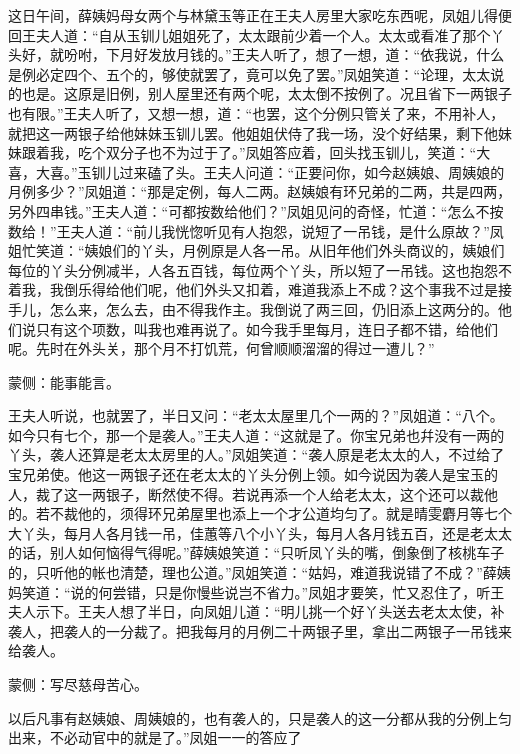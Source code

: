 \begin{parag}
    这日午间，薛姨妈母女两个与林黛玉等正在王夫人房里大家吃东西呢，凤姐儿得便回王夫人道：“自从玉钏儿姐姐死了，太太跟前少着一个人。太太或看准了那个丫头好，就吩咐，下月好发放月钱的。”王夫人听了，想了一想，道：“依我说，什么是例必定四个、五个的，够使就罢了，竟可以免了罢。”凤姐笑道：“论理，太太说的也是。这原是旧例，别人屋里还有两个呢，太太倒不按例了。况且省下一两银子也有限。”王夫人听了，又想一想，道：“也罢，这个分例只管关了来，不用补人，就把这一两银子给他妹妹玉钏儿罢。他姐姐伏侍了我一场，没个好结果，剩下他妹妹跟着我，吃个双分子也不为过于了。”凤姐答应着，回头找玉钏儿，笑道：“大喜，大喜。”玉钏儿过来磕了头。王夫人问道：“正要问你，如今赵姨娘、周姨娘的月例多少？”凤姐道：“那是定例，每人二两。赵姨娘有环兄弟的二两，共是四两，另外四串钱。”王夫人道：“可都按数给他们？”凤姐见问的奇怪，忙道：“怎么不按数给！”王夫人道：“前儿我恍惚听见有人抱怨，说短了一吊钱，是什么原故？”凤姐忙笑道：“姨娘们的丫头，月例原是人各一吊。从旧年他们外头商议的，姨娘们每位的丫头分例减半，人各五百钱，每位两个丫头，所以短了一吊钱。这也抱怨不着我，我倒乐得给他们呢，他们外头又扣着，难道我添上不成？这个事我不过是接手儿，怎么来，怎么去，由不得我作主。我倒说了两三回，仍旧添上这两分的。他们说只有这个项数，叫我也难再说了。如今我手里每月，连日子都不错，给他们呢。先时在外头关，那个月不打饥荒，何曾顺顺溜溜的得过一遭儿？”\begin{note}蒙侧：能事能言。\end{note}王夫人听说，也就罢了，半日又问：“老太太屋里几个一两的？”凤姐道：“八个。如今只有七个，那一个是袭人。”王夫人道：“这就是了。你宝兄弟也幷没有一两的丫头，袭人还算是老太太房里的人。”凤姐笑道：“袭人原是老太太的人，不过给了宝兄弟使。他这一两银子还在老太太的丫头分例上领。如今说因为袭人是宝玉的人，裁了这一两银子，断然使不得。若说再添一个人给老太太，这个还可以裁他的。若不裁他的，须得环兄弟屋里也添上一个才公道均匀了。就是晴雯麝月等七个大丫头，每月人各月钱一吊，佳蕙等八个小丫头，每月人各月钱五百，还是老太太的话，别人如何恼得气得呢。”薛姨娘笑道：“只听凤丫头的嘴，倒象倒了核桃车子的，只听他的帐也清楚，理也公道。”凤姐笑道：“姑妈，难道我说错了不成？”薛姨妈笑道：“说的何尝错，只是你慢些说岂不省力。”凤姐才要笑，忙又忍住了，听王夫人示下。王夫人想了半日，向凤姐儿道：“明儿挑一个好丫头送去老太太使，补袭人，把袭人的一分裁了。把我每月的月例二十两银子里，拿出二两银子一吊钱来给袭人。\begin{note}蒙侧：写尽慈母苦心。\end{note}以后凡事有赵姨娘、周姨娘的，也有袭人的，只是袭人的这一分都从我的分例上匀出来，不必动官中的就是了。”凤姐一一的答应了
\end{parag}
